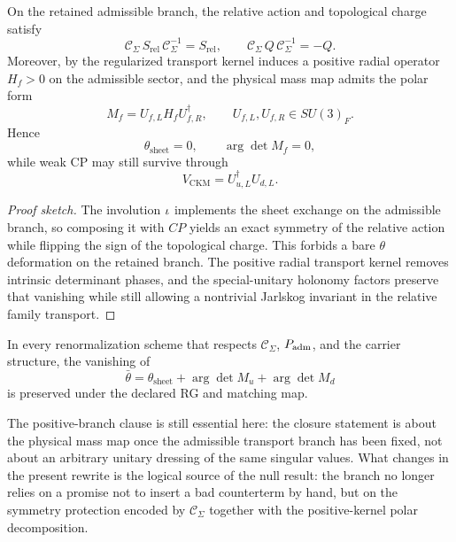 \begin{theorem}
\label{thm:sheet-cp-protection}
On the retained admissible branch, the relative action and topological charge satisfy
\[
\mathcal C_\Sigma\,S_{\mathrm{rel}}\,\mathcal C_\Sigma^{-1}=S_{\mathrm{rel}},
\qquad
\mathcal C_\Sigma\,Q\,\mathcal C_\Sigma^{-1}=-Q.
\]
Moreover, by  the regularized transport kernel induces a positive radial operator $H_f>0$ on the admissible sector, and the physical mass map admits the polar form
\[
M_f=U_{f,L}H_fU_{f,R}^\dagger,
\qquad
U_{f,L},U_{f,R}\in SU(3)_F.
\]
Hence
\[
\theta_{\mathrm{sheet}}=0,
\qquad
\arg\det M_f=0,
\]
while weak CP may still survive through
\[
V_{\mathrm{CKM}}=U_{u,L}^\dagger U_{d,L}.
\]
\end{theorem}

\begin{proof}[Proof sketch]
The involution $\iota$ implements the sheet exchange on the admissible branch, so composing it with $CP$ yields an exact symmetry of the relative action while flipping the sign of the topological charge. This forbids a bare $\theta$ deformation on the retained branch. The positive radial transport kernel removes intrinsic determinant phases, and the special-unitary holonomy factors preserve that vanishing while still allowing a nontrivial Jarlskog invariant in the relative family transport.
\end{proof}

\begin{corollary}[RG stability of $\bar\theta=0$]
\label{cor:strong-cp-rg-stability}
In every renormalization scheme that respects $\mathcal C_\Sigma$, $P_{\mathrm{adm}}$, and the carrier structure, the vanishing of
\[
\bar\theta=\theta_{\mathrm{sheet}}+\arg\det M_u+\arg\det M_d
\]
is preserved under the declared RG and matching map.
\end{corollary}

The positive-branch clause is still essential here: the closure statement is about the physical mass map once the admissible transport branch has been fixed, not about an arbitrary unitary dressing of the same singular values. What changes in the present rewrite is the logical source of the null result: the branch no longer relies on a promise not to insert a bad counterterm by hand, but on the symmetry protection encoded by $\mathcal C_\Sigma$ together with the positive-kernel polar decomposition.

